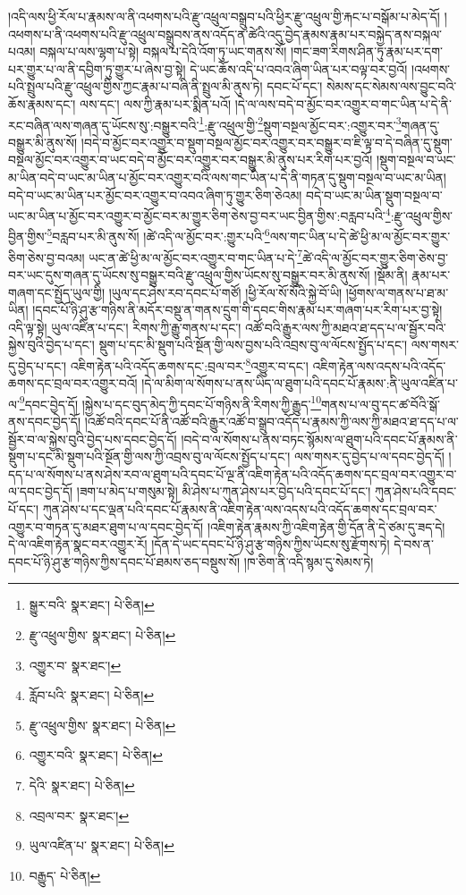།འདི་ལས་ཕྱི་རོལ་པ་རྣམས་ལ་ནི་འཕགས་པའི་རྫུ་འཕྲུལ་བསྒྲུབ་པའི་ཕྱིར་རྫུ་འཕྲུལ་གྱི་རྐང་པ་བསྒོམ་པ་མེད་དོ། །འཕགས་པ་ནི་འཕགས་པའི་རྫུ་འཕྲུལ་བསྒྲུབས་ནས་འདོད་ན་ཚེའི་འདུ་བྱེད་རྣམས་རྣམ་པར་བསྐྱེད་ནས་བསྐལ་པའམ། བསྐལ་པ་ལས་ལྷག་པ་སྟེ། བསྐལ་པ་དེའི་འོག་ཏུ་ཡང་གནས་སོ། །གང་ཟག་རིགས་ཤིན་ཏུ་རྣམ་པར་དག་པར་གྱུར་པ་ལ་ནི་དབྱིག་ཏུ་གྱུར་པ་ཞེས་བྱ་སྟེ། དེ་ཡང་ཆོས་འདི་པ་འབའ་ཞིག་ཡིན་པར་བལྟ་བར་བྱའོ། །འཕགས་པའི་སྤྲུལ་པའི་རྫུ་འཕྲུལ་གྱིས་ཀྱང་རྣམ་པ་བཞི་ནི་སྤྲུལ་མི་ནུས་ཏེ། དབང་པོ་དང་། སེམས་དང་སེམས་ལས་བྱུང་བའི་ཆོས་རྣམས་དང་། ལས་དང་། ལས་ཀྱི་རྣམ་པར་སྨིན་པའོ། །དེ་ལ་ལས་བདེ་བ་མྱོང་བར་འགྱུར་བ་གང་ཡིན་པ་དེ་ནི་རང་བཞིན་ལས་གཞན་དུ་ཡོངས་སུ་:བསྒྱུར་བའི་\footnote{སྒྱུར་བའི་  སྣར་ཐང་།  པེ་ཅིན། }:རྫུ་འཕྲུལ་གྱི་\footnote{རྫུ་འཕྲུལ་གྱིས་  སྣར་ཐང་།  པེ་ཅིན། }སྡུག་བསྔལ་མྱོང་བར་:འགྱུར་བར་\footnote{འགྱུར་བ་  སྣར་ཐང་། }གཞན་དུ་བསྒྱུར་མི་ནུས་སོ། །བདེ་བ་མྱོང་བར་འགྱུར་བ་སྡུག་བསྔལ་མྱོང་བར་འགྱུར་བར་བསྒྱུར་བ་ཇི་ལྟ་བ་དེ་བཞིན་དུ་སྡུག་བསྔལ་མྱོང་བར་འགྱུར་བ་ཡང་བདེ་བ་མྱོང་བར་འགྱུར་བར་བསྒྱུར་མི་ནུས་པར་རིག་པར་བྱའོ། །སྡུག་བསྔལ་བ་ཡང་མ་ཡིན་བདེ་བ་ཡང་མ་ཡིན་པ་མྱོང་བར་འགྱུར་བའི་ལས་གང་ཡིན་པ་དེ་ནི་གཏན་དུ་སྡུག་བསྔལ་བ་ཡང་མ་ཡིན། བདེ་བ་ཡང་མ་ཡིན་པར་མྱོང་བར་འགྱུར་བ་འབའ་ཞིག་ཏུ་གྱུར་ཅིག་ཅེའམ། བདེ་བ་ཡང་མ་ཡིན་སྡུག་བསྔལ་བ་ཡང་མ་ཡིན་པ་མྱོང་བར་འགྱུར་བ་མྱོང་བར་མ་གྱུར་ཅིག་ཅེས་བྱ་བར་ཡང་བྱིན་གྱིས་:བརླབ་པའི་\footnote{རློབ་པའི་  སྣར་ཐང་།  པེ་ཅིན། }:རྫུ་འཕྲུལ་གྱིས་བྱིན་གྱིས་\footnote{རྫུ་འཕྲུལ་གྱིས་  སྣར་ཐང་།  པེ་ཅིན། }བརླབ་པར་མི་ནུས་སོ། །ཚེ་འདི་ལ་མྱོང་བར་:གྱུར་པའི་\footnote{འགྱུར་བའི་  སྣར་ཐང་།  པེ་ཅིན། }ལས་གང་ཡིན་པ་དེ་ཚེ་ཕྱི་མ་ལ་མྱོང་བར་གྱུར་ཅིག་ཅེས་བྱ་བའམ། ཡང་ན་ཚེ་ཕྱི་མ་ལ་མྱོང་བར་འགྱུར་བ་གང་ཡིན་པ་དེ་\footnote{དེའི་  སྣར་ཐང་།  པེ་ཅིན། }ཚེ་འདི་ལ་མྱོང་བར་གྱུར་ཅིག་ཅེས་བྱ་བར་ཡང་དུས་གཞན་དུ་ཡོངས་སུ་བསྒྱུར་བའི་རྫུ་འཕྲུལ་གྱིས་ཡོངས་སུ་བསྒྱུར་བར་མི་ནུས་སོ། །སྡོམ་ནི། རྣམ་པར་གཞག་དང་སྤྱོད་ཡུལ་གྱི། །ཡུལ་དང་ཤེས་རབ་དབང་པོ་གཙོ། །ཕྱི་རོལ་སོ་སོའི་སྐྱེ་བོ་ཡི། །ཕྱོགས་ལ་གནས་པ་ཐ་མ་ཡིན། །དབང་པོ་ཉི་ཤུ་རྩ་གཉིས་ནི་མདོར་བསྡུ་ན་གནས་དྲུག་གི་དབང་གིས་རྣམ་པར་གཞག་པར་རིག་པར་བྱ་སྟེ། འདི་ལྟ་སྟེ། ཡུལ་འཛིན་པ་དང་། རིགས་ཀྱི་རྒྱུ་གནས་པ་དང་། འཚོ་བའི་རྒྱུར་ལས་ཀྱི་མཐའ་ཐ་དད་པ་ལ་སྦྱོར་བའི་སྐྱེས་བུའི་བྱེད་པ་དང་། སྡུག་པ་དང་མི་སྡུག་པའི་སྔོན་གྱི་ལས་བྱས་པའི་འབྲས་བུ་ལ་ལོངས་སྤྱོད་པ་དང་། ལས་གསར་དུ་བྱེད་པ་དང་། འཇིག་རྟེན་པའི་འདོད་ཆགས་དང་:བྲལ་བར་\footnote{འབྲལ་བར་  སྣར་ཐང་། }འགྱུར་བ་དང་། འཇིག་རྟེན་ལས་འདས་པའི་འདོད་ཆགས་དང་བྲལ་བར་འགྱུར་བའོ། །དེ་ལ་མིག་ལ་སོགས་པ་ནས་ཡིད་ལ་ཐུག་པའི་དབང་པོ་རྣམས་:ནི་ཡུལ་འཛིན་པ་ལ་\footnote{ཡུལ་འཛིན་པ་  སྣར་ཐང་།  པེ་ཅིན། }དབང་བྱེད་དོ། །སྐྱེས་པ་དང་བུད་མེད་ཀྱི་དབང་པོ་གཉིས་ནི་རིགས་ཀྱི་རྒྱུད་\footnote{བརྒྱུད་  པེ་ཅིན། }གནས་པ་ལ་བུ་དང་ཚ་བོའི་སྒོ་ནས་དབང་བྱེད་དོ། །འཚོ་བའི་དབང་པོ་ནི་འཚོ་བའི་རྒྱུར་འཚོ་བ་སྒྲུབ་འདོད་པ་རྣམས་ཀྱི་ལས་ཀྱི་མཐའ་ཐ་དད་པ་ལ་སྦྱོར་བ་ལ་སྐྱེས་བུའི་བྱེད་པས་དབང་བྱེད་དོ། །བདེ་བ་ལ་སོགས་པ་ནས་བཏང་སྙོམས་ལ་ཐུག་པའི་དབང་པོ་རྣམས་ནི་སྡུག་པ་དང་མི་སྡུག་པའི་སྔོན་གྱི་ལས་ཀྱི་འབྲས་བུ་ལ་ལོངས་སྤྱོད་པ་དང་། ལས་གསར་དུ་བྱེད་པ་ལ་དབང་བྱེད་དོ། །དད་པ་ལ་སོགས་པ་ནས་ཤེས་རབ་ལ་ཐུག་པའི་དབང་པོ་ལྔ་ནི་འཇིག་རྟེན་པའི་འདོད་ཆགས་དང་བྲལ་བར་འགྱུར་བ་ལ་དབང་བྱེད་དོ། །ཟག་པ་མེད་པ་གསུམ་སྟེ། མི་ཤེས་པ་ཀུན་ཤེས་པར་བྱེད་པའི་དབང་པོ་དང་། ཀུན་ཤེས་པའི་དབང་པོ་དང་། ཀུན་ཤེས་པ་དང་ལྡན་པའི་དབང་པོ་རྣམས་ནི་འཇིག་རྟེན་ལས་འདས་པའི་འདོད་ཆགས་དང་བྲལ་བར་འགྱུར་བ་གཏན་དུ་མཐར་ཐུག་པ་ལ་དབང་བྱེད་དོ། །འཇིག་རྟེན་རྣམས་ཀྱི་འཇིག་རྟེན་གྱི་དོན་ནི་དེ་ཙམ་དུ་ཟད་དེ། དེ་ལ་འཇིག་རྟེན་སྣང་བར་འགྱུར་རོ། །དོན་དེ་ཡང་དབང་པོ་ཉི་ཤུ་རྩ་གཉིས་ཀྱིས་ཡོངས་སུ་རྫོགས་ཏེ། དེ་བས་ན་དབང་པོ་ཉི་ཤུ་རྩ་གཉིས་ཀྱིས་དབང་པོ་ཐམས་ཅད་བསྡུས་སོ། །ཁ་ཅིག་ནི་འདི་སྙམ་དུ་སེམས་ཏེ། 